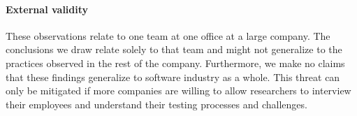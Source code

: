 \paragraph{External validity}
These observations relate to one team at one office at a large company.
The conclusions we draw relate solely to that team and might not generalize to the practices observed in the rest of the company.
Furthermore, we make no claims that these findings generalize to software industry as a whole.
This threat can only be mitigated if more companies are willing to allow researchers to interview their employees and understand their testing processes and challenges.